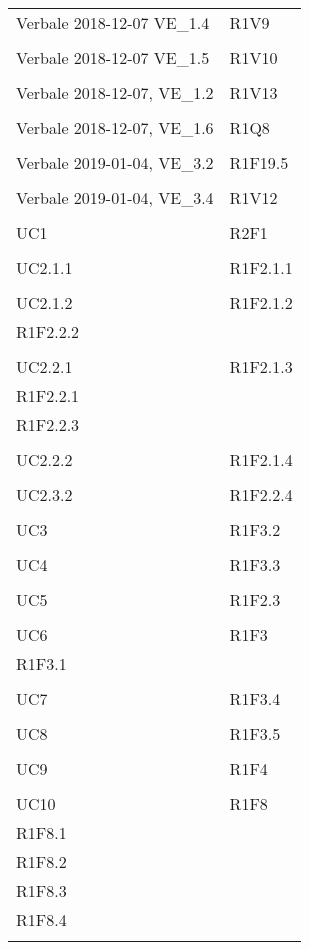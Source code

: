 \begin{longtable}{ >{\centering}p{}
		>{\centering}p{}}
	Verbale 2018-12-07  VE\_1.4 & R1V9\\
	\tabularnewline
	
	Verbale 2018-12-07  VE\_1.5 & R1V10\\
	\tabularnewline
	
	Verbale 2018-12-07, VE\_1.2 & R1V13\\
	\tabularnewline
	
	Verbale 2018-12-07, VE\_1.6 & R1Q8\\
	\tabularnewline
	
	Verbale 2019-01-04, VE\_3.2 & R1F19.5\\
	\tabularnewline
	
	Verbale 2019-01-04, VE\_3.4 & R1V12\\
	\tabularnewline
	
	UC1 & R2F1\\
	\tabularnewline
	
	UC2.1.1 & R1F2.1.1\\
	\tabularnewline
	
	UC2.1.2 & R1F2.1.2\\
	R1F2.2.2 \\\tabularnewline
	
	UC2.2.1 & R1F2.1.3\\
	R1F2.2.1 \\R1F2.2.3 \\\tabularnewline
	
	UC2.2.2 & R1F2.1.4\\
	\tabularnewline
	
	UC2.3.2 & R1F2.2.4\\
	\tabularnewline
	
	UC3 & R1F3.2\\
	\tabularnewline
	
	UC4 & R1F3.3\\
	\tabularnewline
	
	UC5 & R1F2.3\\
	\tabularnewline
	
	UC6 & R1F3\\
	R1F3.1 \\\tabularnewline
	
	UC7 & R1F3.4\\
	\tabularnewline
	
	UC8 & R1F3.5\\
	\tabularnewline
	
	UC9 & R1F4\\
	\tabularnewline
	
	UC10 & R1F8\\
	R1F8.1 \\R1F8.2 \\R1F8.3 \\R1F8.4 \\\tabularnewline
	

\end{longtable}
